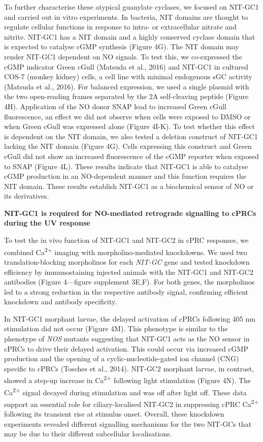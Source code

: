 \documentclass[
  10pt,
  onecolumn]{article}
\begin{document}
To further characterise these atypical guanylate cyclases, we focused on
NIT-GC1 and carried out in vitro experiments. In bacteria, NIT domains
are thought to regulate cellular functions in response to intra- or
extracellular nitrate and nitrite. NIT-GC1 has a NIT domain and a highly
conserved cyclase domain that is expected to catalyse cGMP synthesis
(Figure 4G). The NIT domain may render NIT-GC1 dependent on NO signals.
To test this, we co-expressed the cGMP indicator Green cGull (Matsuda et
al., 2016) and NIT-GC1 in cultured COS-7 (monkey kidney) cells, a cell
line with minimal endogenous sGC activity (Matsuda et al., 2016). For
balanced expression, we used a single plasmid with the two open-reading
frames separated by the 2A self-cleaving peptide (Figure 4H).
Application of the NO donor SNAP lead to increased Green cGull
fluorescence, an effect we did not observe when cells were exposed to
DMSO or when Green cGull was expressed alone (Figure 4I-K). To test
whether this effect is dependent on the NIT domain, we also tested a
deletion construct of NIT-GC1 lacking the NIT domain (Figure 4G). Cells
expressing this construct and Green cGull did not show an increased
fluorescence of the cGMP reporter when exposed to SNAP (Figure 4L).
These results indicate that NIT-GC1 is able to catalyse cGMP production
in an NO-dependent manner and this function requires the NIT domain.
These results establish NIT-GC1 as a biochemical sensor of NO or its
derivatives.

\textbf{NIT-GC1 is required for NO-mediated retrograde signalling to
cPRCs during the UV response}

To test the in vivo function of NIT-GC1 and NIT-GC2 in cPRC responses,
we combined Ca\textsuperscript{2+} imaging with morpholino-mediated
knockdowns. We used two translation-blocking morpholinos for each
\emph{NIT-GC} gene and tested knockdown efficiency by immunostaining
injected animals with the NIT-GC1 and NIT-GC2 antibodies (Figure
4---figure supplement 3E,F). For both genes, the morpholinos led to a
strong reduction in the respective antibody signal, confirming efficient
knockdown and antibody specificity.

In NIT-GC1 morphant larvae, the delayed activation of cPRCs following
405 nm stimulation did not occur (Figure 4M). This phenotype is similar
to the phenotype of \emph{NOS} mutants suggesting that NIT-GC1 acts as
the NO sensor in cPRCs to drive their delayed activation. This could
occur via increased cGMP production and the opening of a
cyclic-nucleotide-gated ion channel (CNG) specific to cPRCs (Tosches et
al., 2014). NIT-GC2 morphant larvae, in contrast, showed a step-up
increase in Ca\textsuperscript{2+} following light stimulation (Figure
4N). The Ca\textsuperscript{2+} signal decayed during stimulation and
was off after light off. These data support an essential role for
ciliary-localised NIT-GC2 in suppressing cPRC Ca\textsuperscript{2+}
following its transient rise at stimulus onset. Overall, these knockdown
experiments revealed different signalling mechanisms for the two NIT-GCs
that may be due to their different subcellular localisations.
\end{document}
